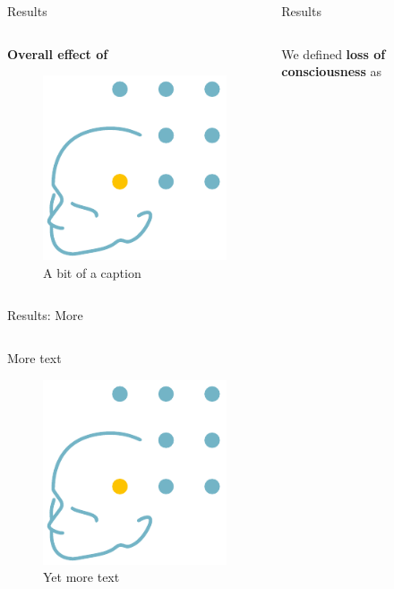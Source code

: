 \documentclass{beamer}
\renewcommand{\emph}{\textbf}
\newenvironment{wideitemize}{\itemize\addtolength{\itemsep}{.2em}\addtolength{\labelsep}{.1ex}}{\enditemize}
\begin{document}
\begin{frame}[t]
\begin{columns}[T]
\begin{column}{.32\linewidth}
\begin{block}{Results}
\begin{columns}[T]
\begin{column}{.95\linewidth}
\emph{Overall effect of}
\begin{wideitemize}
\item 
\end{wideitemize}
\begin{figure}
\label{fig:proptimecourse}
\begin{center}
\includegraphics[width=.2\linewidth]{logo-epi.png}
\end{center}
\caption{A bit of a caption}
\end{figure}
\end{column}
\end{columns}
\end{block}
\begin{block}{Results: More}
\begin{columns}
\begin{column}{.95\linewidth}
More text

\begin{figure}
\label{fig:severalunits}
\begin{center}
\includegraphics[width=.2\linewidth]{logo-epi.png}
\end{center}
\caption{Yet more text}
\end{figure}
\end{column}
\end{columns}
\end{block}


\end{column}

\begin{column}{.32\linewidth}
\begin{block}{Results}
\begin{columns}[T]
\begin{column}{.95\linewidth}
\begin{wideitemize}
\item We defined \emph{loss of consciousness} as
\item 
\item 
\item 


\end{wideitemize}
\end{column}
\end{columns}
\end{block}
\end{column}
\end{columns}
\end{frame}
\end{document}
